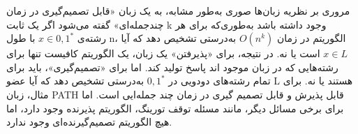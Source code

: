 \begin{itemframe}{مروری بر نظریه زبان‌ها صوری}
\itm
به‌طور مشابه، به یک زبان «قابل تصمیم‌گیری در زمان چندجمله‌ای»
 گفته می‌شود اگر یک ثابت k وجود داشته باشد به‌طوری‌که برای هر رشته‌ی
$x \in {0,1}^*$
با طول n، الگوریتم در زمان $O(n^k)$ به‌درستی تشخیص دهد که آیا $x \in L$ است یا نه.
\itm
در نتیجه، برای «پذیرفتن» یک زبان، یک الگوریتم کافیست تنها برای رشته‌هایی که در زبان موجود اند پاسخ تولید کند.
اما برای «تصمیم‌گیری»، باید برای تمام رشته‌های دودویی در
${0,1}^*$
به‌درستی تشخیص دهد که آیا عضو L هستند یا نه.
\itm
برای مثال، زبان PATH قابل پذیرش و قابل تصمیم گیری در زمان چند جمله‌ایی است. اما برای برخی مسائل دیگر، مانند مسئله توقف تورینگ، الگوریتم پذیرنده وجود دارد، اما هیچ الگوریتم تصمیم‌گیرنده‌ای وجود ندارد.
\end{itemframe}
